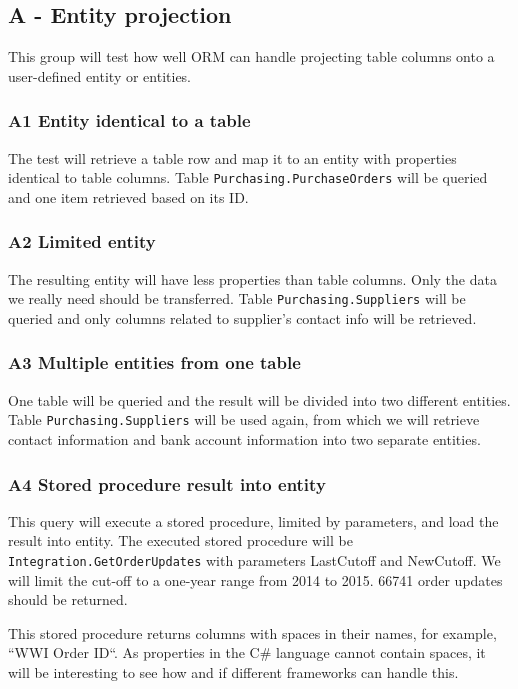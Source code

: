 \subsection{A - Entity projection}
This group will test how well ORM can handle projecting table columns onto a user-defined entity or entities. 

\subsubsection*{A1 Entity identical to a table}
The test will retrieve a table row and map it to an entity with properties identical to table columns. 
Table \texttt{Purchasing.PurchaseOrders} will be queried and one item retrieved based on its ID.

\subsubsection*{A2 Limited entity}
The resulting entity will have less properties than table columns. Only the data we really need should be transferred. 
Table \texttt{Purchasing.Suppliers} will be queried and only columns related to supplier's contact info will be retrieved.

\subsubsection*{A3 Multiple entities from one table}
One table will be queried and the result will be divided into two different entities. 
Table \texttt{Purchasing.Suppliers} will be used again, from which we will retrieve contact information and bank account information into two separate entities. 


\subsubsection*{A4 Stored procedure result into entity}
This query will execute a stored procedure, limited by parameters, and load the result into entity.
The executed stored procedure will be \texttt{Integration.GetOrderUpdates} with parameters LastCutoff and NewCutoff. 
We will limit the cut-off to a one-year range from 2014 to 2015. 66741 order updates should be returned.

This stored procedure returns columns with spaces in their names, for example, ``WWI Order ID``. As properties in the C\# language cannot contain spaces, it will be interesting to see how and if different frameworks can handle this.

